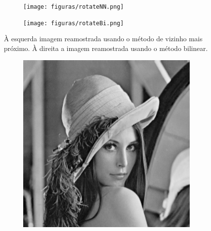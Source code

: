 \documentclass[t]{beamer}
\begin{document}
\begin{frame}
  \begin{figure}[H]
    \centering
    \begin{subfigure}[b]{0.49\textwidth}
      \texttt{[image: figuras/rotateNN.png]}
    \end{subfigure}
    \begin{subfigure}[b]{0.49\textwidth}
      \texttt{[image: figuras/rotateBi.png]}
    \end{subfigure}
    \caption{À esquerda imagem reamostrada usando o método de vizinho mais próximo. 
             À direita a imagem reamostrada usando o método bilinear.}
  \end{figure}
\end{frame}

\begin{frame}
  \begin{figure}[H]
    \centering
    \begin{subfigure}[b]{0.49\textwidth}
      \includegraphics[width=1\textwidth]{figuras/static.png}
    \end{subfigure}
    \begin{subfigure}[b]{0.49\textwidth}

\end{subfigure}
\end{figure}
\end{frame}
\end{document}
